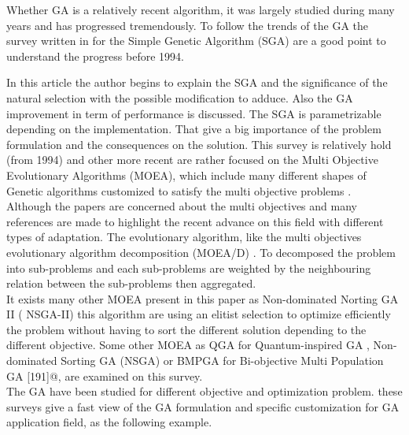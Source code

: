 Whether GA is a relatively recent algorithm, it was largely studied during many years and has progressed tremendously. To follow the trends of the GA  the survey  written in \cite{74*srinivas1994} for the Simple Genetic Algorithm (SGA) are a good point to understand the progress before 1994. 

In this article \cite{74*srinivas1994} the author begins to explain the SGA and the significance of the natural selection with the possible modification to adduce. 
Also the GA improvement  in term of performance is discussed. The SGA is parametrizable depending on the implementation. That give a big importance of the problem formulation and the consequences on the solution.
 This survey is  relatively hold (from 1994) and other more recent are rather focused on the Multi Objective Evolutionary Algorithms (MOEA), which include many different shapes of Genetic algorithms customized to satisfy the multi objective problems \cite{75*zhou2011}. \\
Although the papers are concerned about the multi objectives and many references are made to highlight the recent advance on this field with different types of adaptation. The evolutionary algorithm, like the multi objectives evolutionary algorithm decomposition (MOEA/D) \cite{114*zhang2007}. To decomposed the problem into sub-problems and each sub-problems are weighted by the neighbouring relation between the sub-problems then aggregated.  \\ 

It exists many other MOEA present in this paper as Non-dominated Norting GA II ( NSGA-II) \cite{69*deb2000} this  algorithm are using an elitist selection to optimize efficiently the problem without having to sort the different solution depending to the different objective. Some other MOEA as QGA for Quantum-inspired GA \cite{ 69*deb2000,han2000,han2002}%
, Non-dominated Sorting GA  (NSGA) or BMPGA for Bi-objective Multi Population GA [191]@,  are examined on this survey\cite{69*deb2000}. \\
The GA have been studied for different objective and optimization problem. these surveys  give a fast  view of  the GA formulation and  specific customization for  GA application field, as the following example.\\

